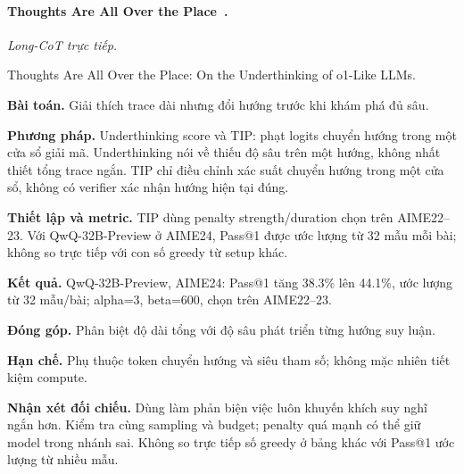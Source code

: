 \begin{samepage}
\paragraph{Thoughts Are All Over the Place~\cite{rra3_underthinking}.}
\emph{Long-CoT trực tiếp.}\par
{\raggedright\noindent\small Thoughts Are All Over the Place: On the Underthinking of o1-Like LLMs.\par}
\noindent\textbf{Bài toán.} Giải thích trace dài nhưng đổi hướng trước khi khám phá đủ sâu.\par
\end{samepage}
\noindent\textbf{Phương pháp.} Underthinking score và TIP: phạt logits chuyển hướng trong một cửa sổ giải mã. Underthinking nói về thiếu độ sâu trên một hướng, không nhất thiết tổng trace ngắn. TIP chỉ điều chỉnh xác suất chuyển hướng trong một cửa sổ, không có verifier xác nhận hướng hiện tại đúng.\par
\noindent\textbf{Thiết lập và metric.} TIP dùng penalty strength/duration chọn trên AIME22–23. Với QwQ-32B-Preview ở AIME24, Pass@1 được ước lượng từ 32 mẫu mỗi bài; không so trực tiếp với con số greedy từ setup khác.\par
\noindent\textbf{Kết quả.} QwQ-32B-Preview, AIME24: Pass@1 tăng 38.3\% lên 44.1\%, ước lượng từ 32 mẫu/bài; alpha=3, beta=600, chọn trên AIME22–23.\par
\noindent\textbf{Đóng góp.} Phân biệt độ dài tổng với độ sâu phát triển từng hướng suy luận.\par
\noindent\textbf{Hạn chế.} Phụ thuộc token chuyển hướng và siêu tham số; không mặc nhiên tiết kiệm compute.\par
\begin{samepage}
\noindent\textbf{Nhận xét đối chiếu.} Dùng làm phản biện việc luôn khuyến khích suy nghĩ ngắn hơn. Kiểm tra cùng sampling và budget; penalty quá mạnh có thể giữ model trong nhánh sai. Không so trực tiếp số greedy ở bảng khác với Pass@1 ước lượng từ nhiều mẫu.\par
{}
\end{samepage}


